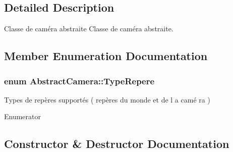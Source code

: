 \subsection{Detailed Description}
Classe de caméra abstraite Classe de caméra abstraite. 

\subsection{Member Enumeration Documentation}
\subsubsection[{\texorpdfstring{Type\+Repere}{TypeRepere}}]{\setlength{\rightskip}{0pt plus 5cm}enum {\bf Abstract\+Camera\+::\+Type\+Repere}}\hypertarget{class_abstract_camera_a4d3cc29d2eb150eada1bb387648eae98}{}\label{class_abstract_camera_a4d3cc29d2eb150eada1bb387648eae98}
Types de repères supportés ( repères du monde et de l a camé ra ) \begin{Desc}
\item[Enumerator]\par
\begin{description}
\item[{\em 
M\+O\+N\+DE\hypertarget{class_abstract_camera_a4d3cc29d2eb150eada1bb387648eae98a4136744a39efe4b86f6743eecc488eb8}{}\label{class_abstract_camera_a4d3cc29d2eb150eada1bb387648eae98a4136744a39efe4b86f6743eecc488eb8}
}]\item[{\em 
C\+A\+M\+E\+RA\hypertarget{class_abstract_camera_a4d3cc29d2eb150eada1bb387648eae98a7fc33f57f9cabf6771b5fdfa9c64494c}{}\label{class_abstract_camera_a4d3cc29d2eb150eada1bb387648eae98a7fc33f57f9cabf6771b5fdfa9c64494c}
}]\end{description}
\end{Desc}


\subsection{Constructor \& Destructor Documentation}
